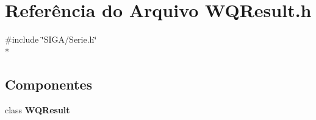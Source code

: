 \section{Referência do Arquivo W\+Q\+Result.\+h}
\label{_w_q_result_8h}
{\ttfamily \#include \char`\"{}S\+I\+G\+A/\+Serie.\+h\char`\"{}}\\*
\subsection*{Componentes}
\begin{DoxyCompactItemize}
\item 
class {\bf W\+Q\+Result}
\end{DoxyCompactItemize}
